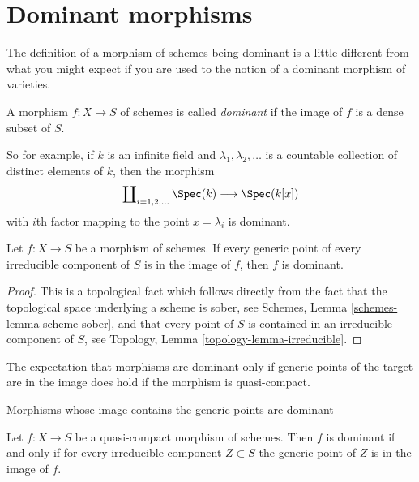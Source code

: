 \section{Dominant morphisms}
\label{section-dominant}

\noindent
The definition of a morphism of schemes being dominant is a little
different from what you might expect if you are used to the notion
of a dominant morphism of varieties.

\begin{definition}
\label{definition-dominant}
A morphism $f : X \to S$ of schemes is called {\it dominant} if the
image of $f$ is a dense subset of $S$.
\end{definition}

\noindent
So for example, if $k$ is an infinite field and $\lambda_1, \lambda_2, \ldots$
is a countable collection of distinct elements of $k$, then the morphism
$$
\coprod\nolimits_{i = 1, 2, \ldots } \Spec(k)
\longrightarrow
\Spec(k[x])
$$
with $i$th factor mapping to the point $x = \lambda_i$ is dominant.

\begin{lemma}
\label{lemma-generic-points-in-image-dominant}
Let $f : X \to S$ be a morphism of schemes.
If every generic point of every irreducible component of $S$
is in the image of $f$, then $f$ is dominant.
\end{lemma}

\begin{proof}
This is a topological fact which follows directly from the fact that
the topological space underlying a scheme is sober, see
Schemes, Lemma \ref{schemes-lemma-scheme-sober}, and that
every point of $S$ is contained in an irreducible component of
$S$, see Topology, Lemma \ref{topology-lemma-irreducible}.
\end{proof}

\noindent
The expectation that morphisms are dominant only if generic points of the
target are in the image does hold if the morphism is quasi-compact.

\begin{lemma}
\label{lemma-quasi-compact-dominant}
\begin{slogan}
Morphisms whose image contains the generic points are dominant
\end{slogan}
Let $f : X \to S$ be a quasi-compact morphism of schemes.
Then $f$ is dominant if and only if for every irreducible
component $Z \subset S$ the generic point of $Z$ is in the
image of $f$.
\end{lemma}

